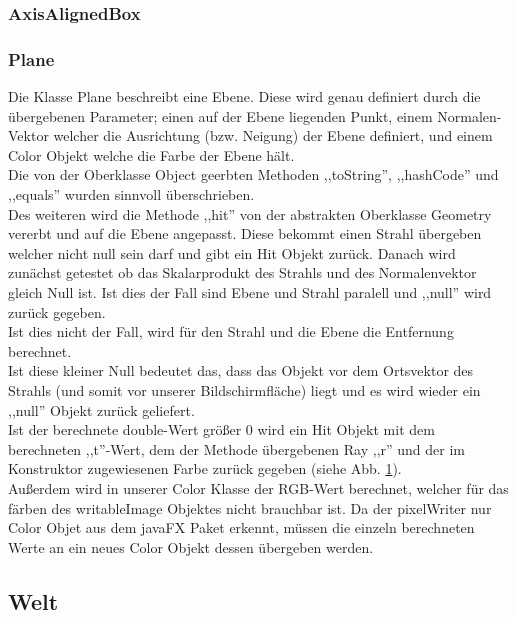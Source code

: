 \documentclass[14pt]{extarticle}
\begin{document}
\subsubsection{AxisAlignedBox}
\subsubsection{Plane}

Die Klasse Plane beschreibt eine Ebene. Diese wird genau definiert durch die übergebenen Parameter; einen auf der Ebene liegenden Punkt, einem Normalen-Vektor welcher die Ausrichtung (bzw. Neigung) der Ebene definiert, und einem Color Objekt welche die Farbe der Ebene hält. \\
Die von der Oberklasse Object geerbten Methoden ,,toString'', ,,hashCode'' und ,,equals'' wurden sinnvoll überschrieben.\\
Des weiteren wird die Methode ,,hit'' von der abstrakten Oberklasse Geometry vererbt und auf die Ebene angepasst. Diese bekommt einen Strahl übergeben welcher nicht null sein darf und gibt ein Hit Objekt zurück. Danach wird zunächst getestet ob das Skalarprodukt des Strahls und des Normalenvektor gleich Null ist. Ist dies der Fall sind Ebene und Strahl paralell und ,,null'' wird zurück gegeben. \\
Ist dies nicht der Fall, wird für den Strahl und die Ebene die Entfernung berechnet. \\
Ist diese kleiner Null bedeutet das, dass das Objekt vor dem Ortsvektor des Strahls (und somit vor unserer Bildschirmfläche) liegt und es wird wieder ein ,,null'' Objekt zurück geliefert. \\
Ist der berechnete double-Wert größer 0 wird ein Hit Objekt mit dem berechneten ,,t''-Wert, dem der Methode übergebenen Ray ,,r'' und der im Konstruktor zugewiesenen Farbe zurück gegeben (siehe Abb. \ref{Ebene}).\\
Außerdem wird in unserer Color Klasse der RGB-Wert berechnet, welcher für das färben des writableImage Objektes nicht brauchbar ist. Da der pixelWriter nur Color Objet aus dem javaFX Paket erkennt, müssen die einzeln berechneten Werte an ein neues Color Objekt dessen übergeben werden.
\begin{figure}[ht]
\begin{center}
\label{Ebene}
\end{center}
\end{figure}


\subsection{Welt}
\end{document}
